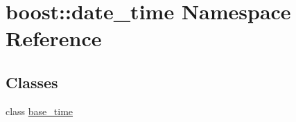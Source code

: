 \hypertarget{namespaceboost_1_1date__time}{}\section{boost\+:\+:date\+\_\+time Namespace Reference}
\label{namespaceboost_1_1date__time}
\subsection*{Classes}
\begin{DoxyCompactItemize}
\item 
class \hyperlink{classboost_1_1date__time_1_1base__time}{base\+\_\+time}
\end{DoxyCompactItemize}
